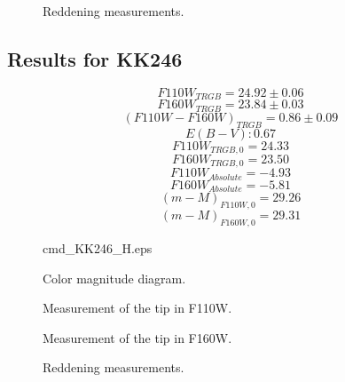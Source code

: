 \documentclass[12,manuscript,usenatbib]{aastex}
\begin{document}
\begin{figure}
\caption{Reddening measurements.\label{reddening1}}
\end{figure}

\subsection{Results for KK246}

\begin{equation}
F110W_{TRGB}=24.92 \pm 0.06
\end{equation}
\begin{equation}
F160W_{TRGB}=23.84 \pm 0.03
\end{equation}
\begin{equation}
(F110W-F160W)_{TRGB}=0.86 \pm 0.09
\end{equation}
\begin{equation}
E(B-V): 0.67
\end{equation}
\begin{equation}
F110W_{TRGB,0} = 24.33
\end{equation}
\begin{equation}
F160W_{TRGB,0} = 23.50
\end{equation}
\begin{equation}
F110W_{Absolute} = -4.93
\end{equation}
\begin{equation}
F160W_{Absolute} = -5.81
\end{equation}
\begin{equation}
(m-M)_{F110W,0}=29.26
\end{equation}
\begin{equation}
(m-M)_{F160W,0}=29.31
\end{equation}

\begin{figure}
 {cmd_KK246_H.eps}
\caption{Color magnitude diagram.\label{cmd2}}
\end{figure}

\begin{figure}
\caption{Measurement of the tip in F110W.\label{lf2_1}}
\end{figure}

\begin{figure}
\caption{Measurement of the tip in F160W.\label{lf2_2}}
\end{figure}


\begin{figure}
\caption{Reddening measurements.\label{reddening2}}
\end{figure}





\end{document}
